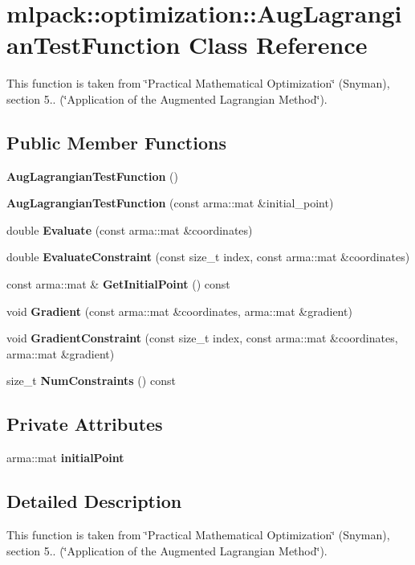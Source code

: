 \section{mlpack\+:\+:optimization\+:\+:Aug\+Lagrangian\+Test\+Function Class Reference}
\label{classmlpack_1_1optimization_1_1AugLagrangianTestFunction}


This function is taken from \char`\"{}\+Practical Mathematical Optimization\char`\"{} (Snyman), section 5.. (\char`\"{}\+Application of the Augmented Lagrangian Method\char`\"{}).  


\subsection*{Public Member Functions}
\begin{DoxyCompactItemize}
\item 
{\bf Aug\+Lagrangian\+Test\+Function} ()
\item 
{\bf Aug\+Lagrangian\+Test\+Function} (const arma\+::mat \&initial\+\_\+point)
\item 
double {\bf Evaluate} (const arma\+::mat \&coordinates)
\item 
double {\bf Evaluate\+Constraint} (const size\+\_\+t index, const arma\+::mat \&coordinates)
\item 
const arma\+::mat \& {\bf Get\+Initial\+Point} () const 
\item 
void {\bf Gradient} (const arma\+::mat \&coordinates, arma\+::mat \&gradient)
\item 
void {\bf Gradient\+Constraint} (const size\+\_\+t index, const arma\+::mat \&coordinates, arma\+::mat \&gradient)
\item 
size\+\_\+t {\bf Num\+Constraints} () const 
\end{DoxyCompactItemize}
\subsection*{Private Attributes}
\begin{DoxyCompactItemize}
\item 
arma\+::mat {\bf initial\+Point}
\end{DoxyCompactItemize}


\subsection{Detailed Description}
This function is taken from \char`\"{}\+Practical Mathematical Optimization\char`\"{} (Snyman), section 5.. (\char`\"{}\+Application of the Augmented Lagrangian Method\char`\"{}). 

